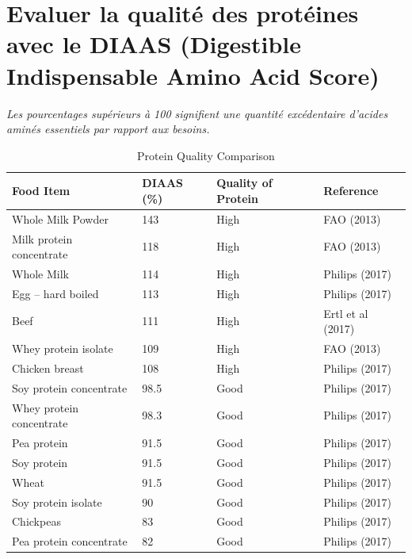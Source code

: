 \documentclass[11pt]{article}
\begin{document}
\section{Evaluer la qualité des protéines avec le DIAAS (Digestible Indispensable Amino Acid Score)}
\textit{Les pourcentages supérieurs à 100 signifient une quantité excédentaire d'acides aminés essentiels par rapport aux besoins.}
\begin{table}[h!]
    \centering
    \begin{tabular}{@{}llll@{}}
    \toprule
    \textbf{Food Item}        & \textbf{DIAAS (\%)} & \textbf{Quality of Protein} & \textbf{Reference}    \\ \midrule
    Whole Milk Powder         & 143                 & High                        & FAO (2013)            \\
    Milk protein concentrate  & 118                 & High                        & FAO (2013)            \\
    Whole Milk                & 114                 & High                        & Philips (2017)        \\
    Egg – hard boiled         & 113                 & High                        & Philips (2017)        \\
    Beef                      & 111                 & High                        & Ertl et al (2017)     \\
    Whey protein isolate      & 109                 & High                        & FAO (2013)            \\
    Chicken breast            & 108                 & High                        & Philips (2017)        \\
    Soy protein concentrate   & 98.5                & Good                        & Philips (2017)        \\
    Whey protein concentrate  & 98.3                & Good                        & Philips (2017)        \\
    Pea protein               & 91.5                & Good                        & Philips (2017)        \\
    Soy protein               & 91.5                & Good                        & Philips (2017)        \\
    Wheat                     & 91.5                & Good                        & Philips (2017)        \\
    Soy protein isolate       & 90                  & Good                        & Philips (2017)        \\
    Chickpeas                 & 83                  & Good                        & Philips (2017)        \\
    Pea protein concentrate   & 82                  & Good                        & Philips (2017)        \\ \bottomrule
    \end{tabular}
    \caption{Protein Quality Comparison}
    \label{tab:protein_quality}
\end{table}
    
\end{document}
